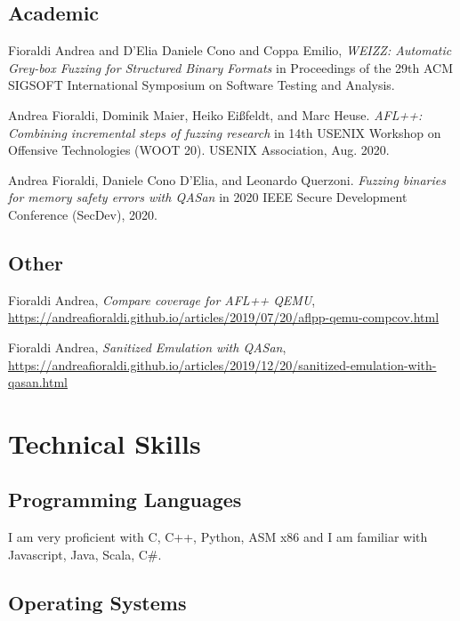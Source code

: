 \documentclass[10pt, a4paper]{article}
\newcommand{\years}[1]{\marginnote{\scriptsize #1}}
\begin{document}
\subsection*{Academic}

\noindent
\years{2020} Fioraldi Andrea and D'Elia Daniele Cono and Coppa Emilio, \textit{WEIZZ: Automatic Grey-box Fuzzing for Structured Binary Formats} in Proceedings of the 29th ACM SIGSOFT International Symposium on Software Testing and Analysis.

\noindent
\years{2020} Andrea Fioraldi, Dominik Maier, Heiko Eißfeldt, and Marc Heuse. \textit{AFL++: Combining incremental steps of fuzzing research} in 14th USENIX Workshop on Offensive Technologies (WOOT 20). USENIX Association, Aug. 2020.

\noindent
\years{2020} Andrea Fioraldi, Daniele Cono D’Elia, and Leonardo Querzoni. \textit{Fuzzing binaries for memory safety errors with QASan} in 2020 IEEE Secure Development Conference (SecDev), 2020.

\subsection*{Other}

\noindent
\years{2019} Fioraldi Andrea, \textit{Compare coverage for AFL++ QEMU}, \href{https://andreafioraldi.github.io/articles/2019/07/20/aflpp-qemu-compcov.html}{https://andreafioraldi.github.io/articles/2019/07/20/aflpp-qemu-compcov.html}

\noindent
\years{2019} Fioraldi Andrea, \textit{Sanitized Emulation with QASan}, \href{https://andreafioraldi.github.io/articles/2019/12/20/sanitized-emulation-with-qasan.html}{https://andreafioraldi.github.io/articles/2019/12/20/sanitized-emulation-with-qasan.html}

\section*{Technical Skills}

\subsection*{Programming Languages}

I am very proficient with C, C++, Python, ASM x86 and I am familiar with Javascript, Java, Scala, C\#.

\subsection*{Operating Systems}
\end{document}
